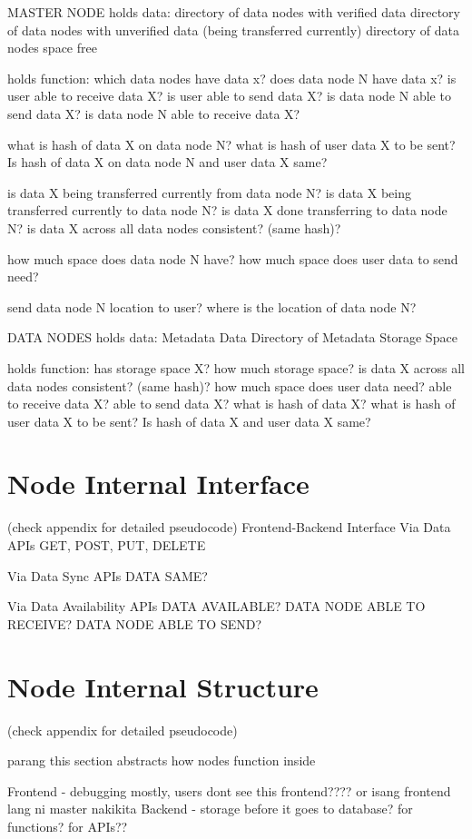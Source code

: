 \documentclass[acmsmall]{acmart}
\begin{document}
MASTER NODE
holds data:
directory of data nodes with verified data
directory of data nodes with unverified data (being transferred currently)
directory of data nodes space free

holds function:
which data nodes have data x?
does data node N have data x?
is user able to receive data X?
is user able to send data X?
is data node N able to send data X?
is data node N able to receive data X?


what is hash of data X on data node N?
what is hash of user data X to be sent?
Is hash of data X on data node N and user data X same?


is data X being transferred currently from data node N?
is data X being transferred currently to data node N?
is data X done transferring to data node N?
is data X across all data nodes consistent? (same hash)?

how much space does data node N have?
how much space does user data to send need?

send data node N location to user?
where is the location of data node N?


DATA NODES
holds data:
Metadata
Data
Directory of Metadata
Storage Space


holds function:
has storage space X?
how much storage space?
is data X across all data nodes consistent? (same hash)?
how much space does user data need?
able to receive data X?
able to send data X?
what is hash of data X?
what is hash of user data X to be sent?
Is hash of data X and user data X same?

\section{Node Internal Interface}
(check appendix for detailed pseudocode)
Frontend-Backend Interface
Via Data APIs
GET, POST, PUT, DELETE

Via Data Sync APIs
DATA SAME? 

Via Data Availability APIs
DATA AVAILABLE?
DATA NODE ABLE TO RECEIVE?
DATA NODE ABLE TO SEND?

\section{Node Internal Structure}
(check appendix for detailed pseudocode)

parang this section abstracts how nodes function inside

Frontend - debugging mostly, users dont see this frontend???? or isang frontend lang ni master nakikita
Backend - storage before it goes to database? for functions? for APIs??
 
\end{document}
